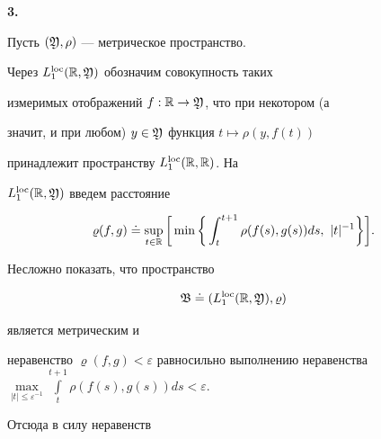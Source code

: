 \medskip


\addtocounter{section}{1}


\setcounter{equation}{0}


\setcounter{lems}{0}


\setcounter{defns}{0}


\setcounter{notes}{0}


\setcounter{thms}{0}


\setcounter{cors}{0}


\setcounter{exams}{0}





{\bf 3.}


Пусть $(\frak Y,\rho)$ --- метрическое пространство.


Через $L_1^{\operatorname{loc}}(\Bbb R,\frak Y)$ обозначим совокупность таких


измеримых отображений $f:\Bbb R\to\frak Y$, что при некотором (а


значит, и при любом) $y\in\frak Y$ функция $t\mapsto\rho(y,f(t))$


принадлежит пространству $L_1^{\operatorname{loc}}(\Bbb R,\Bbb R)$. На


$L_1^{\operatorname{loc}}(\Bbb R,\frak Y)$ введем расстояние


\begin{equation}


\varrho(f,g)\doteq


\sup_{t\in\Bbb R}\bigg[\min\bigg\{\int_t^{t+1}


\rho(f(s),g(s))ds,\ |t|^{-1}\bigg\}\bigg].


\end{equation}


Несложно показать, что пространство


\begin{equation}


\frak B\doteq(L_1^{\loc}(\Bbb R,\frak Y),\varrho)


\end{equation}


является метрическим и 


неравенство $\varrho(f,g)<\varepsilon$ равносильно выполнению неравенства\\


$\max\limits_{|t|\le\varepsilon^{-1}}


\int\limits_t^{t+1}\rho(f(s),g(s))ds<\varepsilon$.


Отсюда в силу неравенств


$$


